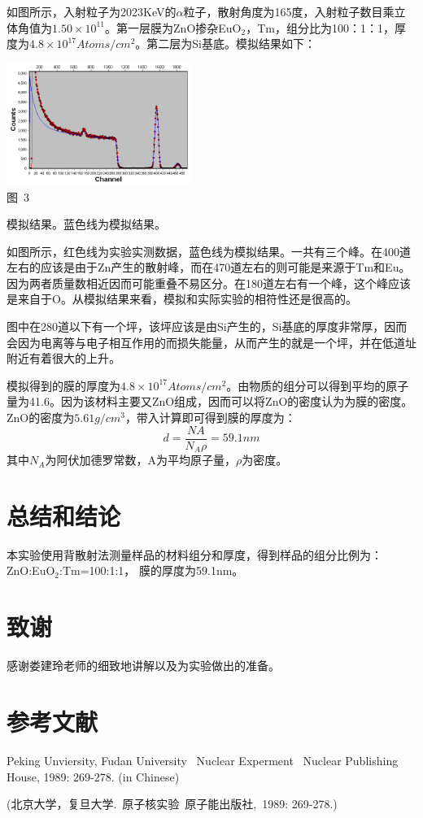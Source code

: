 \documentclass[a4paper,10.0pt,twoside]{npr}
\begin{document}
\begin{multicols}{2}
如图所示，入射粒子为2023KeV的$\alpha$粒子，散射角度为165度，入射粒子数目乘立体角值为$1.50\times 10^{11}$。第一层膜为ZnO掺杂EuO$_2$，Tm，组分比为100：1：1，厚度为$4.8\times10^{17}Atoms/cm^2$。第二层为Si基底。模拟结果如下：
\begin{center}
   \includegraphics[width=0.45\textwidth]{3.png}
\\
\xiaowu\song 图~3\begin{minipage}[t]{75mm} \quad 模拟结果。蓝色线为模拟结果。\\[-1mm]\wuhao
\end{minipage}
\end{center}

如图所示，红色线为实验实测数据，蓝色线为模拟结果。一共有三个峰。在400道左右的应该是由于Zn产生的散射峰，而在470道左右的则可能是来源于Tm和Eu。因为两者质量数相近因而可能重叠不易区分。在180道左右有一个峰，这个峰应该是来自于O。从模拟结果来看，模拟和实际实验的相符性还是很高的。

图中在280道以下有一个坪，该坪应该是由Si产生的，Si基底的厚度非常厚，因而会因为电离等与电子相互作用的而损失能量，从而产生的就是一个坪，并在低道址附近有着很大的上升。

模拟得到的膜的厚度为$4.8\times10^{17}Atoms/cm^2$。由物质的组分可以得到平均的原子量为41.6。因为该材料主要又ZnO组成，因而可以将ZnO的密度认为为膜的密度。ZnO的密度为$5.61g/cm^3$，带入计算即可得到膜的厚度为：
\begin{equation}
	d=\frac{NA}{N_A\rho}=59.1nm
\end{equation}
其中$N_A$为阿伏加德罗常数，A为平均原子量，$\rho$为密度。

\section{总结和结论}
本实验使用背散射法测量样品的材料组分和厚度，得到样品的组分比例为：ZnO:EuO$_2$:Tm=100:1:1， 膜的厚度为59.1nm。

\section{致谢}
感谢娄建玲老师的细致地讲解以及为实验做出的准备。
\section{参考文献}

\noindent
[1] Peking Unviersity, Fudan University \ Nuclear Experment
\ Nuclear Publishing House, 1989: 269-278. (in Chinese)

\noindent
 (北京大学，复旦大学.\ 原子核实验\ 原子能出版社,\ 1989: 269-278.)
\end{multicols}
\end{document}
